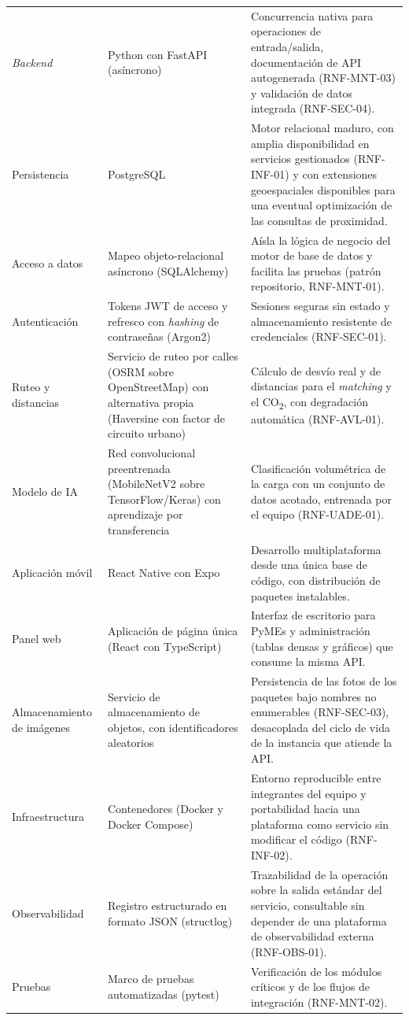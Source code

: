 {\begin{longtable}{p{3.1cm}p{4.4cm}p{6cm}}
    \emph{Backend} & Python con FastAPI (asíncrono) & Concurrencia nativa para operaciones de entrada/salida, documentación de API autogenerada (RNF-MNT-03) y validación de datos integrada (RNF-SEC-04). \\
    Persistencia & PostgreSQL & Motor relacional maduro, con amplia disponibilidad en servicios gestionados (RNF-INF-01) y con extensiones geoespaciales disponibles para una eventual optimización de las consultas de proximidad. \\
    Acceso a datos & Mapeo objeto-relacional asíncrono (SQLAlchemy) & Aísla la lógica de negocio del motor de base de datos y facilita las pruebas (patrón repositorio, RNF-MNT-01). \\
    Autenticación & Tokens JWT de acceso y refresco con \emph{hashing} de contraseñas (Argon2) & Sesiones seguras sin estado y almacenamiento resistente de credenciales (RNF-SEC-01). \\
    Ruteo y distancias & Servicio de ruteo por calles (OSRM sobre OpenStreetMap) con alternativa propia (Haversine con factor de circuito urbano) & Cálculo de desvío real y de distancias para el \emph{matching} y el CO\textsubscript{2}, con degradación automática (RNF-AVL-01). \\
    Modelo de IA & Red convolucional preentrenada (MobileNetV2 sobre TensorFlow/Keras) con aprendizaje por transferencia & Clasificación volumétrica de la carga con un conjunto de datos acotado, entrenada por el equipo (RNF-UADE-01). \\
    Aplicación móvil & React Native con Expo & Desarrollo multiplataforma desde una única base de código, con distribución de paquetes instalables. \\
    Panel web & Aplicación de página única (React con TypeScript) & Interfaz de escritorio para PyMEs y administración (tablas densas y gráficos) que consume la misma API. \\
    Almacenamiento de imágenes & Servicio de almacenamiento de objetos, con identificadores aleatorios & Persistencia de las fotos de los paquetes bajo nombres no enumerables (RNF-SEC-03), desacoplada del ciclo de vida de la instancia que atiende la API. \\
    Infraestructura & Contenedores (Docker y Docker Compose) & Entorno reproducible entre integrantes del equipo y portabilidad hacia una plataforma como servicio sin modificar el código (RNF-INF-02). \\
    Observabilidad & Registro estructurado en formato JSON (structlog) & Trazabilidad de la operación sobre la salida estándar del servicio, consultable sin depender de una plataforma de observabilidad externa (RNF-OBS-01). \\
    Pruebas & Marco de pruebas automatizadas (pytest) & Verificación de los módulos críticos y de los flujos de integración (RNF-MNT-02). \\
\end{longtable}

}
